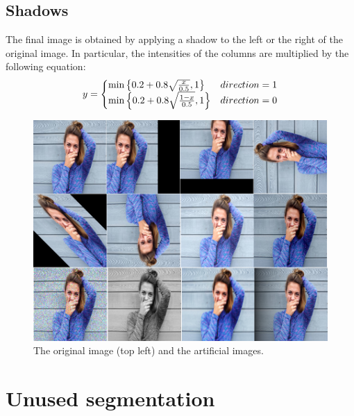 \subsection{Shadows}
The final image is obtained by applying a shadow  to the left or the right of the original image. In particular, the intensities of the columns are multiplied by the following equation:
\[
y =
\left\{
\begin{array}{
  @{}%
  l@{\quad}%
  r@{}%
  >{{}}r@{}%
  >{{}}l@{}%
}
  \text{min}\left\{0.2 + 0.8 \sqrt{\frac{x}{0.5}}, 1\right\}    &   direction = 1\\
  \text{min}\left\{0.2 + 0.8 \sqrt{\frac{1- x}{0.5}}, 1\right\}    &   direction = 0\\
\end{array}
\right.
\]
\begin{figure}
  \centering
  \includegraphics[width=13cm]{images/Immagine.png}
  \caption{The original image (top left) and the artificial images.}
  \label{fig:f01}
\end{figure}
\pagebreak
\section{Unused segmentation}


